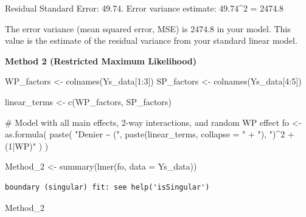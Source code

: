 \documentclass[
  letterpaper,
  DIV=11,
  numbers=noendperiod]{scrartcl}
\newenvironment{Shaded}{\begin{snugshade}}{\end{snugshade}}
\newcommand{\AttributeTok}[1]{\textcolor[rgb]{0.40,0.45,0.13}{#1}}
\newcommand{\CommentTok}[1]{\textcolor[rgb]{0.37,0.37,0.37}{#1}}
\newcommand{\DecValTok}[1]{\textcolor[rgb]{0.68,0.00,0.00}{#1}}
\newcommand{\FunctionTok}[1]{\textcolor[rgb]{0.28,0.35,0.67}{#1}}
\newcommand{\NormalTok}[1]{\textcolor[rgb]{0.00,0.23,0.31}{#1}}
\newcommand{\OtherTok}[1]{\textcolor[rgb]{0.00,0.23,0.31}{#1}}
\newcommand{\SpecialCharTok}[1]{\textcolor[rgb]{0.37,0.37,0.37}{#1}}
\newcommand{\StringTok}[1]{\textcolor[rgb]{0.13,0.47,0.30}{#1}}
\begin{document}
Residual Standard Error: 49.74. Error variance estimate: 49.74\^{}2 =
2474.8

The error variance (mean squared error, MSE) is 2474.8 in your model.
This value is the estimate of the residual variance from your standard
linear model.

\textbf{Method 2 (Restricted Maximum Likelihood)}

\begin{Shaded}
\begin{Highlighting}[]
\NormalTok{WP\_factors }\OtherTok{\textless{}{-}} \FunctionTok{colnames}\NormalTok{(Ys\_data[}\DecValTok{1}\SpecialCharTok{:}\DecValTok{3}\NormalTok{])}
\NormalTok{SP\_factors }\OtherTok{\textless{}{-}} \FunctionTok{colnames}\NormalTok{(Ys\_data[}\DecValTok{4}\SpecialCharTok{:}\DecValTok{5}\NormalTok{])}

\NormalTok{linear\_terms }\OtherTok{\textless{}{-}} \FunctionTok{c}\NormalTok{(WP\_factors, SP\_factors)}

\CommentTok{\# Model with all main effects, 2{-}way interactions, and random WP effect}
\NormalTok{fo }\OtherTok{\textless{}{-}} \FunctionTok{as.formula}\NormalTok{(}
  \FunctionTok{paste}\NormalTok{(}
    \StringTok{"Denier \textasciitilde{} ("}\NormalTok{, }
    \FunctionTok{paste}\NormalTok{(linear\_terms, }\AttributeTok{collapse =} \StringTok{" + "}\NormalTok{), }
    \StringTok{")\^{}2 + (1|WP)"}
\NormalTok{  )}
\NormalTok{)}

\NormalTok{Method\_2 }\OtherTok{\textless{}{-}} \FunctionTok{summary}\NormalTok{(}\FunctionTok{lmer}\NormalTok{(fo, }\AttributeTok{data =}\NormalTok{ Ys\_data))}
\end{Highlighting}
\end{Shaded}

\begin{verbatim}
boundary (singular) fit: see help('isSingular')
\end{verbatim}

\begin{Shaded}
\begin{Highlighting}[]
\NormalTok{Method\_2}
\end{Highlighting}
\end{Shaded}
\end{document}
